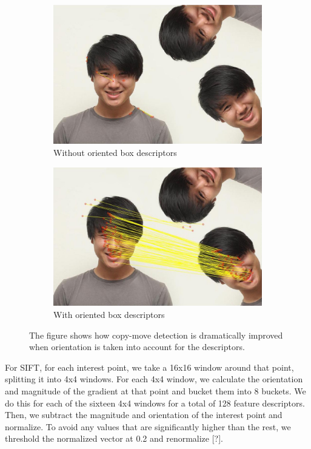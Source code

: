 \documentclass[12pt]{article}
\begin{document}
\begin{figure}
\centering
\begin{subfigure}{.5\textwidth}
  \centering
  \includegraphics[width=.8\linewidth]{./gfx/without_rotation.jpg}
  \caption{Without oriented box descriptors}
  \label{fig:sub1}
\end{subfigure}%
\begin{subfigure}{.5\textwidth}
  \centering
  \includegraphics[width=.8\linewidth]{./gfx/with_rotation.jpg}
  \caption{With oriented box descriptors}
  \label{fig:sub2}
\end{subfigure}
\caption{The figure shows how copy-move detection is dramatically improved when orientation is taken into account for the descriptors.}
\label{fig:test}
\end{figure}

For SIFT, for each interest point, we take a 16x16 window around that point, splitting it into 4x4 windows. For each 4x4 window, we calculate the orientation and magnitude of the gradient at that point and bucket them into 8 buckets. We do this for each of the sixteen 4x4 windows for a total of 128 feature descriptors. Then, we subtract the magnitude and orientation of the interest point and normalize. To avoid any values that are significantly higher than the rest, we threshold the normalized vector at 0.2 and renormalize [?].
\end{document}
